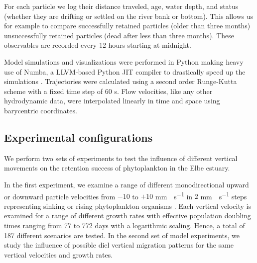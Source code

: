 \documentclass[npg, manuscript]{copernicus}
\begin{document}
For each particle we log their distance traveled, age, water depth, and status (whether they are drifting or settled on the river bank or bottom). This allows us for example to compare successfully retained particles (older than three months) unsuccessfully retained particles (dead after less than three months).
These observables are recorded every 12 hours starting at midnight.

Model simulations and visualizations were performed in Python making heavy use of Numba, a LLVM-based Python JIT compiler \citep{Lam2015} to drastically speed up the simulations \citep{Vennell2021}.
Trajectories were calculated using a second order Runge-Kutta scheme with a fixed time step of 60 \unit{s}.
Flow velocities, like any other hydrodynamic data, were interpolated linearly in time and space using barycentric coordinates.

\subsection{Experimental configurations}

We perform two sets of experiments to test the influence of different vertical movements on the retention success of phytoplankton in the Elbe estuary.

In the first experiment, we examine a range of different monodirectional upward or downward particle velocities from $-10$ to $+10$ \unit{mm\;s^{-1}} in $2$ \unit{mm\;s^{-1}} steps representing sinking or rising phytoplankton organisms \citep{Fennessy1996}.
Each vertical velocity is examined for a range of different growth rates with effective population doubling times ranging from 77 to 772 days with a logarithmic scaling.
Hence, a total of 187 different scenarios are tested.
In the second set of model experiments, we study the influence of possible diel vertical migration patterns for the same vertical velocities and growth rates.
\end{document}
